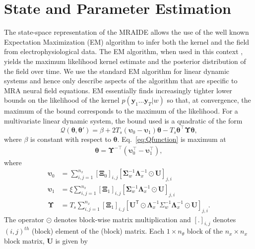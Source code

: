 \documentclass[journal,a4paper]{IEEEtran}
\begin{document}
\section{State and Parameter Estimation}
The state-space representation of the MRAIDE allows the use of the well known Expectation Maximization (EM) algorithm \cite{Dempster1977} to infer both the kernel and the field from electrophysiological data. The EM algorithm, when used in this context \cite{Dewar2009}, yields the maximum likelihood kernel estimate and the posterior distribution of the field over time. We use the standard EM algorithm for linear dynamic systems \cite{Roweis1999,Shumway2000} and hence only describe aspects of the algorithm that are specific to MRA neural field equations. EM essentially finds increasingly tighter lower bounds on the likelihood of the kernel $p(\mathbf{y}_1 \ldots \mathbf{y}_T|w)$ so that, at convergence, the maximum of the bound corresponds to the maximum of the likelihood. For a multivariate linear dynamic system, the bound used is a quadratic of the form
\begin{equation}\label{eq:Qfunction}
 \mathcal Q\left(\boldsymbol \theta,\boldsymbol\theta'\right)=\beta+2T_s\left(\boldsymbol\upsilon_0-\boldsymbol\upsilon_1\right)\boldsymbol\theta-T_s\boldsymbol\theta^\top\boldsymbol\Upsilon\boldsymbol\theta,
\end{equation}
where $\beta$ is constant with respect to $\boldsymbol\theta$. Eq.~\ref{eq:Qfunction} is maximum at
\begin{align}
 \boldsymbol \theta= \boldsymbol\Upsilon^{-\top}(\boldsymbol\upsilon_0^\top-\boldsymbol\upsilon_1^\top),
\end{align}
where
\begin{align}\label{eq:upsilon0}
 \boldsymbol\upsilon_0 & =\sum_{i,j=1}^{n_x}[\boldsymbol\Xi_0]_{i,j}[\boldsymbol\Sigma_{w}^{-1}\boldsymbol\Lambda_{x}^{-1}\odot\mathbf U]_{j,i}\\ 
 \boldsymbol\upsilon_1 & =\xi\sum_{i,j=1}^{n_x}[\boldsymbol\Xi_1]_{i,j}[\boldsymbol\Sigma_{w}^{-1}\boldsymbol\Lambda_{x}^{-1}\odot\mathbf U]_{j,i}\label{eq:upsilon1} \\
 \boldsymbol\Upsilon&=T_s\sum_{i,j=1}^{n_x}[\boldsymbol\Xi_1]_{i,j}[\mathbf{U}^{\mathsf T}\odot \boldsymbol\Lambda_{x}^{-1}\Sigma_{w}^{-1}\boldsymbol\Lambda_{x}^{-1}\odot\mathbf{U}]_{j,i}\label{eq:Upsilon}.
\end{align}
The operator $\odot$ denotes block-wise matrix multiplication and  $[.]_{i,j}$ denotes $\left(i,j\right)^{th}$ (block) element of the (block) matrix. Each $1\times n_{\theta}$ block of the $n_x \times n_x$ block matrix,  $\mathbf U$ is given by
\end{document}
